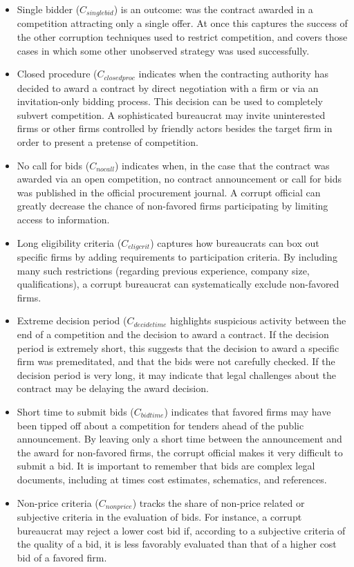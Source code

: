 \begin{itemize}
\item Single bidder ($C_{singlebid}$) is an outcome: was the contract awarded in a competition attracting only a single offer. At once this captures the success of the other corruption techniques used to restrict competition, and covers those cases in which some other unobserved strategy was used successfully.
\item Closed procedure ($C_{closedproc}$ indicates when the contracting authority has decided to award a contract by direct negotiation with a firm or via an invitation-only bidding process. This decision can be used to completely subvert competition. A sophisticated bureaucrat may invite uninterested firms or other firms controlled by friendly actors besides the target firm in order to present a pretense of competition.
\item No call for bids ($C_{nocall}$) indicates when, in the case that the contract was awarded via an open competition, no contract announcement or call for bids was published in the official procurement journal. A corrupt official can greatly decrease the chance of non-favored firms participating by limiting access to information.
\item Long eligibility criteria ($C_{eligcrit}$) captures how bureaucrats can box out specific firms by adding requirements to participation criteria. By including many such restrictions (regarding previous experience, company size, qualifications), a corrupt bureaucrat can systematically exclude non-favored firms.
\item Extreme decision period ($C_{decidetime}$ highlights suspicious activity between the end of a competition and the decision to award a contract. If the decision period is extremely short, this suggests that the decision to award a specific firm was premeditated, and that the bids were not carefully checked. If the decision period is very long, it may indicate that legal challenges about the contract may be delaying the award decision.
\item Short time to submit bids ($C_{bidtime}$) indicates that favored firms may have been tipped off about a competition for tenders ahead of the public announcement. By leaving only a short time between the announcement and the award for non-favored firms, the corrupt official makes it very difficult to submit a bid. It is important to remember that bids are complex legal documents, including at times cost estimates, schematics, and references.
\item Non-price criteria ($C_{nonprice}$) tracks the share of non-price related or subjective criteria in the evaluation of bids. For instance, a corrupt bureaucrat may reject a lower cost bid if, according to a subjective criteria of the quality of a bid, it is less favorably evaluated than that of a higher cost bid of a favored firm.

\end{itemize}
